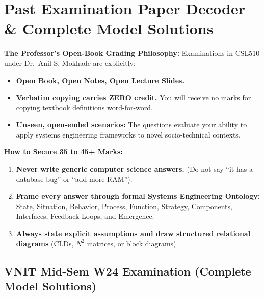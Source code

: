 \chapter{Past Examination Paper Decoder \& Complete Model Solutions}
\label{chap:pyq_solutions}

\begin{tcolorbox}[colback=seAccent!5!white,colframe=seAccent!90!black,title={\sffamily \textbf{THE OPEN-BOOK EXAM STRATEGY: HOW TO SCORE 40+ OUT OF 50}}]
\small
\textbf{The Professor's Open-Book Grading Philosophy:}
Examinations in CSL510 under Dr.~Anil S. Mokhade are explicitly:
\begin{itemize}[leftmargin=1.5em, itemsep=1pt]
    \item \textbf{Open Book, Open Notes, Open Lecture Slides.}
    \item \textbf{Verbatim copying carries ZERO credit.} You will receive no marks for copying textbook definitions word-for-word.
    \item \textbf{Unseen, open-ended scenarios:} The questions evaluate your ability to apply systems engineering frameworks to novel socio-technical contexts.
\end{itemize}
\textbf{How to Secure 35 to 45+ Marks:}
\begin{enumerate}[leftmargin=2em, itemsep=2pt]
    \item \textbf{Never write generic computer science answers.} (Do not say ``it has a database bug'' or ``add more RAM'').
    \item \textbf{Frame every answer through formal Systems Engineering Ontology:} State, Situation, Behavior, Process, Function, Strategy, Components, Interfaces, Feedback Loops, and Emergence.
    \item \textbf{Always state explicit assumptions and draw structured relational diagrams} (CLDs, $N^2$ matrices, or block diagrams).
\end{enumerate}
\end{tcolorbox}

\section{VNIT Mid-Sem W24 Examination (Complete Model Solutions)}
\label{sec:w24_midsem}

